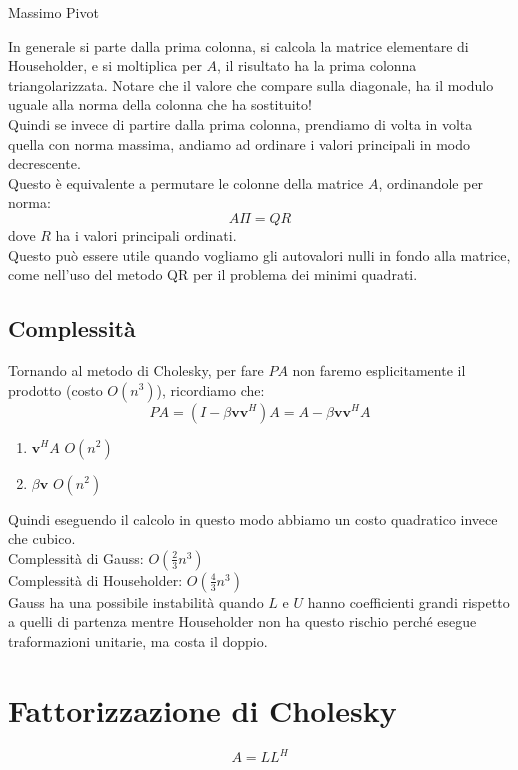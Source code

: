 \begin{subsection}{Massimo Pivot}
\label{qr-max-pivot}
  \begin{workinprogress}
    In generale si parte dalla prima colonna, si calcola la matrice
    elementare di Householder, e si moltiplica per $A$, il risultato ha
    la prima colonna triangolarizzata. Notare che il valore che
    compare sulla diagonale, ha il modulo uguale alla norma della
    colonna che ha sostituito!\\
    Quindi se invece di partire dalla prima colonna, prendiamo di
    volta in volta quella con norma massima, andiamo ad ordinare i
    valori principali in modo decrescente.\\
    Questo è equivalente a permutare le colonne della matrice $A$,
    ordinandole per norma: 
    $$ A \Pi = QR$$
    dove $R$ ha i valori principali ordinati.\\

    Questo può essere utile quando vogliamo gli autovalori nulli in
    fondo alla matrice, come nell'uso del metodo QR per il problema
    dei minimi quadrati.\\
  \end{workinprogress}
\end{subsection}


\subsection{Complessit\`a}
Tornando al metodo di Cholesky, per fare $PA$ non faremo
esplicitamente il prodotto (costo $O(n^3)$), ricordiamo che:
$$ PA = (I - \beta \mathbf{v}\mathbf{v}^{H})A = A - \beta \mathbf{v}\mathbf{v}^{H}A$$
\begin{enumerate}
\item $\mathbf{v}^{H} A$ \quad $O(n^2)$
\item $\beta \mathbf{v}$ \quad $O(n^2)$
\end{enumerate}
Quindi eseguendo il calcolo in questo modo abbiamo un costo quadratico invece che cubico.\\
Complessit\`a di Gauss: $O(\frac{2}{3} n^{3})$ \\
Complessit\`a di Householder: $O(\frac{4}{3} n^{3})$ \\
Gauss ha una possibile instabilit\`a quando $L$ e $U$ hanno coefficienti
grandi rispetto a quelli di partenza mentre Householder non ha questo
rischio perch\'e esegue traformazioni unitarie, ma costa il doppio.


\section{Fattorizzazione di Cholesky}
\label{sec:fatt-cholesky}
$$ A = LL^{H} $$

